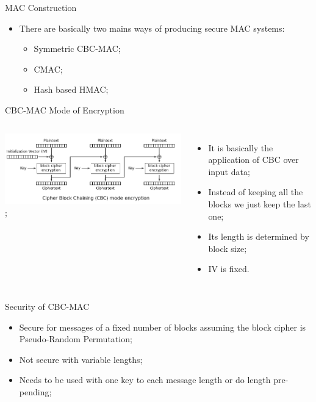 \documentclass[12pt,table,xcolor={dvipsnames}]{beamer}
\begin{document}
\begin{frame}{MAC Construction}
\begin{itemize}
\item There are basically two mains ways of producing secure MAC systems:\pause
\begin{itemize}
\item Symmetric CBC-MAC;\pause
\item CMAC;\pause
\item Hash based HMAC;
\end{itemize}
\end{itemize}
\end{frame}

\begin{frame}{CBC-MAC Mode of Encryption}
\begin{columns}
\begin{center}
\includegraphics[scale=.25]{../Lecture_2/CBC_encryption.png};
\end{center}
\begin{itemize}
\item It is basically the application of CBC over input data;\pause
\item Instead of keeping all the blocks we just keep the last one;\pause
\item Its length is determined by block size;\pause
\item IV is fixed.
\end{itemize}
\end{columns}
\end{frame}

\begin{frame}{Security of CBC-MAC}
\begin{itemize}
\item Secure for messages of a fixed number of blocks assuming the block cipher is Pseudo-Random Permutation;\pause
\item Not secure with variable lengths;\pause
\item Needs to be used with one key to each message length or do length pre-pending;
\end{itemize}
\end{frame}
\end{document}
